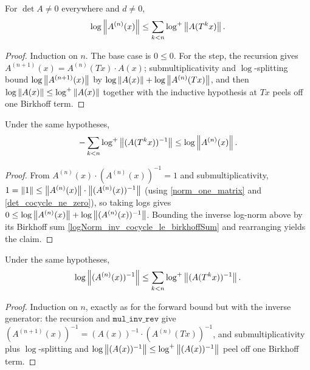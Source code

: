 \begin{lemma}\label{logNorm_cocycle_le_birkhoffSum}
  \leanok
  For \(\det A \neq 0\) everywhere and \(d \neq 0\),
  \[
    \log\left\lVert A^{(n)}(x) \right\rVert \le \sum_{k<n}\log^{+}\left\lVert A(T^{k}x) \right\rVert.
  \]
\end{lemma}
\begin{proof}\leanok
  Induction on \(n\). The base case is \(0 \le 0\). For the step, the recursion gives
  \(A^{(n+1)}(x) = A^{(n)}(Tx)\cdot A(x)\); submultiplicativity and \(\log\)-splitting bound
  \(\log\left\lVert A^{(n+1)}(x) \right\rVert\) by \(\log\left\lVert A(x) \right\rVert + \log\left\lVert A^{(n)}(Tx) \right\rVert\), and then
  \(\log\left\lVert A(x) \right\rVert \le \log^{+}\left\lVert A(x) \right\rVert\) together with the inductive hypothesis at
  \(Tx\) peels off one Birkhoff term.
\end{proof}

\begin{lemma}\label{neg_birkhoffSum_le_logNorm_cocycle}
  \leanok
  Under the same hypotheses,
  \[
    -\sum_{k<n}\log^{+}\left\lVert (A(T^{k}x))^{-1} \right\rVert \le \log\left\lVert A^{(n)}(x) \right\rVert.
  \]
\end{lemma}
\begin{proof}\leanok
  From \(A^{(n)}(x)\cdot (A^{(n)}(x))^{-1} = 1\) and submultiplicativity,
  \(1 = \left\lVert 1 \right\rVert \le \left\lVert A^{(n)}(x) \right\rVert\cdot\left\lVert (A^{(n)}(x))^{-1} \right\rVert\) (using
  \ref{norm_one_matrix} and \ref{det_cocycle_ne_zero}), so taking logs gives
  \(0 \le \log\left\lVert A^{(n)}(x) \right\rVert + \log\left\lVert (A^{(n)}(x))^{-1} \right\rVert\). Bounding the inverse
  log-norm above by its Birkhoff sum \ref{logNorm_inv_cocycle_le_birkhoffSum} and
  rearranging yields the claim.
\end{proof}

\begin{lemma}\label{logNorm_inv_cocycle_le_birkhoffSum}
  \leanok
  Under the same hypotheses,
  \[
    \log\left\lVert (A^{(n)}(x))^{-1} \right\rVert \le \sum_{k<n}\log^{+}\left\lVert (A(T^{k}x))^{-1} \right\rVert.
  \]
\end{lemma}
\begin{proof}\leanok
  Induction on \(n\), exactly as for the forward bound but with the inverse generator: the
  recursion and \(\texttt{mul\_inv\_rev}\) give
  \((A^{(n+1)}(x))^{-1} = (A(x))^{-1}\cdot (A^{(n)}(Tx))^{-1}\), and submultiplicativity plus
  \(\log\)-splitting and \(\log\left\lVert (A(x))^{-1} \right\rVert \le \log^{+}\left\lVert (A(x))^{-1} \right\rVert\) peel off
  one Birkhoff term.
\end{proof}

